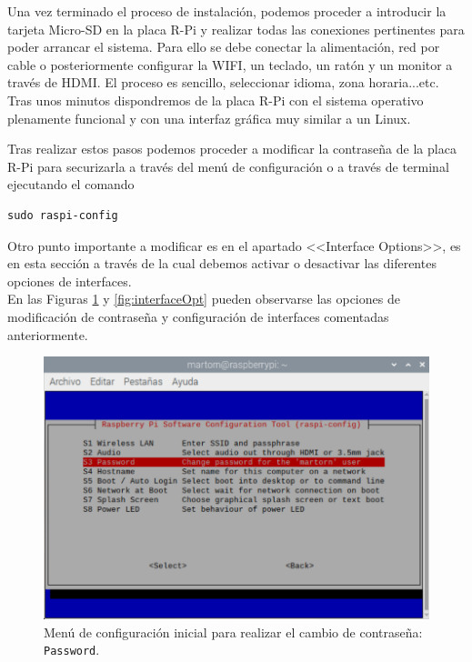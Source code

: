 Una vez terminado el proceso de instalación, podemos proceder a introducir la tarjeta Micro-SD en la placa R-Pi y realizar todas las conexiones pertinentes para poder arrancar el sistema. Para ello se debe conectar la alimentación, red por cable o posteriormente configurar la WIFI, un teclado, un ratón y un monitor a través de HDMI. 
El proceso es sencillo, seleccionar idioma, zona horaria...etc. Tras unos minutos dispondremos de la placa R-Pi con el sistema operativo plenamente funcional y con una interfaz gráfica muy similar a un Linux.

Tras realizar estos pasos podemos proceder a modificar la contraseña de la placa R-Pi para securizarla a través del menú de configuración o a través de terminal ejecutando el comando\\
\begin{lstlisting}[style=terminal]
sudo raspi-config\end{lstlisting}

Otro punto importante a modificar es en el apartado <<Interface Options>>, es en esta sección a través de la cual debemos activar o desactivar las diferentes opciones de interfaces.\\

En las Figuras \ref{fig:cambioContra} y \ref{fig:interfaceOpt} pueden observarse las opciones de modificación de contraseña y configuración de interfaces comentadas anteriormente.

\begin{figure}[tbh]
\centering
\includegraphics[scale=0.7]{images/raspiConfigPass}
\caption[Cambio de contraseña de Raspberry Pi]{Menú de configuración inicial para realizar el cambio de contraseña: {\protect\tt Password}.}%
\label{fig:cambioContra}
\end{figure}

